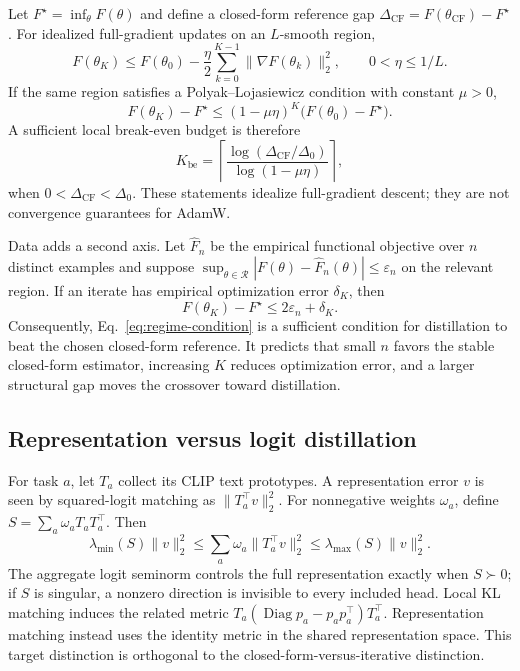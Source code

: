 \documentclass[letterpaper]{article} %
\theoremstyle{plain}
\theoremstyle{definition}
\begin{document}
Let $F^\star=\inf_\theta F(\theta)$ and define a closed-form reference gap
$\Delta_{\mathrm{CF}}=F(\theta_{\mathrm{CF}})-F^\star$. For idealized full-gradient
updates on an $L$-smooth region,
\begin{equation}
F(\theta_K)
\le F(\theta_0)-\frac{\eta}{2}
\sum_{k=0}^{K-1}\|\nabla F(\theta_k)\|_2^2,
\qquad 0<\eta\le 1/L.
\label{eq:compute-descent-main}
\end{equation}
If the same region satisfies a Polyak--Lojasiewicz condition with constant $\mu>0$,
\begin{equation}
F(\theta_K)-F^\star
\le(1-\mu\eta)^K\bigl(F(\theta_0)-F^\star\bigr).
\label{eq:compute-rate-main}
\end{equation}
A sufficient local break-even budget is therefore
\begin{equation}
K_{\mathrm{be}}=
\left\lceil
\frac{\log(\Delta_{\mathrm{CF}}/\Delta_0)}
     {\log(1-\mu\eta)}
\right\rceil,
\label{eq:break-even-main}
\end{equation}
when $0<\Delta_{\mathrm{CF}}<\Delta_0$. These statements idealize full-gradient descent;
they are not convergence guarantees for AdamW.

Data adds a second axis. Let $\widehat F_n$ be the empirical functional objective over
$n$ distinct examples and suppose
$\sup_{\theta\in\mathcal R}|F(\theta)-\widehat F_n(\theta)|\le\varepsilon_n$ on the
relevant region. If an iterate has empirical optimization error $\delta_K$, then
\begin{equation}
F(\theta_K)-F^\star\le 2\varepsilon_n+\delta_K.
\label{eq:finite-data-bound-main}
\end{equation}
Consequently, Eq.~\eqref{eq:regime-condition} is a sufficient condition for distillation
to beat the chosen closed-form reference. It predicts that small $n$ favors the stable
closed-form estimator, increasing $K$ reduces optimization error, and a larger structural
gap moves the crossover toward distillation.

\subsection{Representation versus logit distillation}
\label{sec:head-coverage}

For task $a$, let $T_a$ collect its CLIP text prototypes. A representation error $v$ is
seen by squared-logit matching as $\|T_a^\top v\|_2^2$. For nonnegative weights
$\omega_a$, define $S=\sum_a\omega_aT_aT_a^\top$. Then
\begin{equation}
\lambda_{\min}(S)\|v\|_2^2
\le\sum_a\omega_a\|T_a^\top v\|_2^2
\le\lambda_{\max}(S)\|v\|_2^2.
\label{eq:frame-main}
\end{equation}
The aggregate logit seminorm controls the full representation exactly when $S\succ0$;
if $S$ is singular, a nonzero direction is invisible to every included head. Local KL
matching induces the related metric
$T_a(\operatorname{Diag}p_a-p_ap_a^\top)T_a^\top$. Representation matching instead
uses the identity metric in the shared representation space. This target distinction is
orthogonal to the closed-form-versus-iterative distinction.
\end{document}
